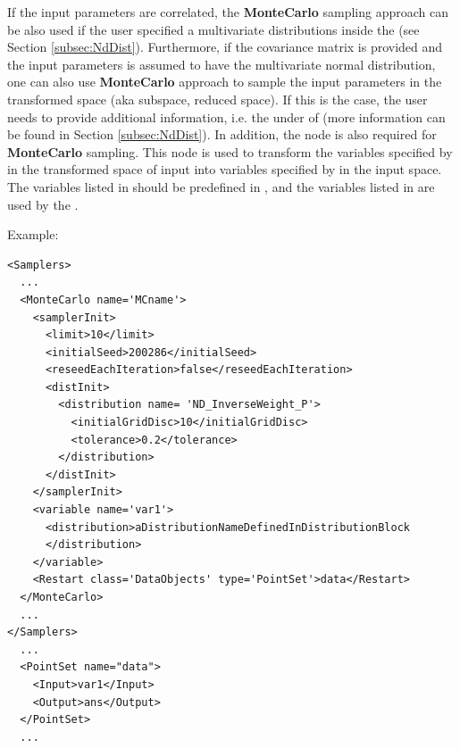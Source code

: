 If the input parameters are correlated, the \textbf{MonteCarlo} sampling approach can be also used if the user specified a
multivariate distributions inside the  (see Section \ref{subsec:NdDist}). Furthermore, if the
covariance matrix is provided and the input parameters is assumed to have the multivariate normal distribution, one can also use
\textbf{MonteCarlo} approach to sample the input parameters in the transformed space (aka subspace, reduced space). If this is
the case, the user needs to provide additional information, i.e. the  under  of
 (more information can be found in Section \ref{subsec:NdDist}). In addition, the node
 is also required for \textbf{MonteCarlo} sampling. This node is used to transform the variables
specified by  in the transformed space of input into variables specified by 
in the input space. The variables listed in  should be predefined in , and the variables
listed in  are used by the .


Example:
\begin{lstlisting}[style=XML]
<Samplers>
  ...
  <MonteCarlo name='MCname'>
    <samplerInit>
      <limit>10</limit>
      <initialSeed>200286</initialSeed>
      <reseedEachIteration>false</reseedEachIteration>
      <distInit>
        <distribution name= 'ND_InverseWeight_P'>
          <initialGridDisc>10</initialGridDisc>
          <tolerance>0.2</tolerance>
        </distribution>
      </distInit>
    </samplerInit>
    <variable name='var1'>
      <distribution>aDistributionNameDefinedInDistributionBlock
      </distribution>
    </variable>
    <Restart class='DataObjects' type='PointSet'>data</Restart>
  </MonteCarlo>
  ...
</Samplers>
  ...
  <PointSet name="data">
    <Input>var1</Input>
    <Output>ans</Output>
  </PointSet>
  ...
\end{lstlisting}

